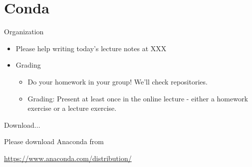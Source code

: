 
\subtitle{Installation of Python in Conda and first steps in Python}
\date{2020-03-26}


\begin{frame}
	\tableofcontents
\end{frame}

\section{Conda}

\begin{frame}{Organization}
	
	\begin{itemize}
		\item Please help writing today's lecture notes at XXX 
		\item Grading
			\begin{itemize}
				\item Do your homework in your group! We'll check repositories.
				\item Grading: Present at least once in the online lecture - either a homework exercise or a lecture exercise.
			\end{itemize}
	\end{itemize}
\end{frame}

\begin{frame}{Download...}
	
	Please download Anaconda from
	
	\href{https://www.anaconda.com/distribution/}{https://www.anaconda.com/distribution/}\\
	
	
	
\end{frame}

